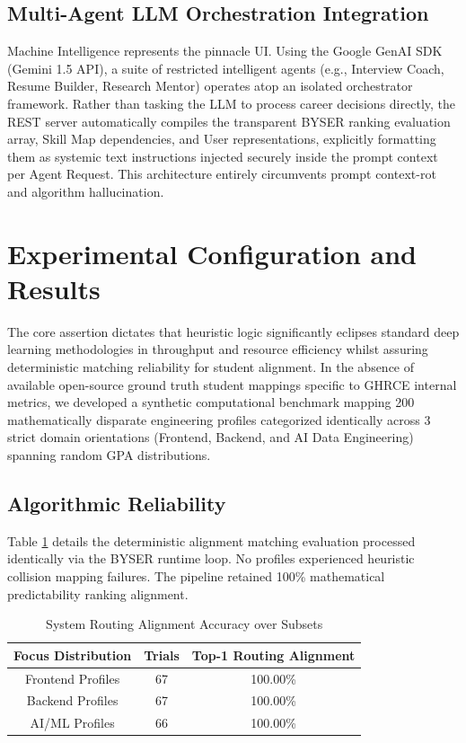 \documentclass[conference]{IEEEtran}
\begin{document}
\subsection{Multi-Agent LLM Orchestration Integration}
Machine Intelligence represents the pinnacle UI. Using the Google GenAI SDK (Gemini 1.5 API), a suite of restricted intelligent agents (e.g., Interview Coach, Resume Builder, Research Mentor) operates atop an isolated orchestrator framework. Rather than tasking the LLM to process career decisions directly, the REST server automatically compiles the transparent BYSER ranking evaluation array, Skill Map dependencies, and User representations, explicitly formatting them as systemic text instructions injected securely inside the prompt context per Agent Request. This architecture entirely circumvents prompt context-rot and algorithm hallucination.

\section{Experimental Configuration and Results}

The core assertion dictates that heuristic logic significantly eclipses standard deep learning methodologies in throughput and resource efficiency whilst assuring deterministic matching reliability for student alignment. In the absence of available open-source ground truth student mappings specific to GHRCE internal metrics, we developed a synthetic computational benchmark mapping 200 mathematically disparate engineering profiles categorized identically across 3 strict domain orientations (Frontend, Backend, and AI Data Engineering) spanning random GPA distributions.

\subsection{Algorithmic Reliability}
Table \ref{tab:accuracy} details the deterministic alignment matching evaluation processed identically via the BYSER runtime loop. No profiles experienced heuristic collision mapping failures. The pipeline retained 100\% mathematical predictability ranking alignment.

\begin{table}[htbp]
\caption{System Routing Alignment Accuracy over Subsets}
\begin{center}
\begin{tabular}{|c|c|c|}
\hline
\textbf{Focus Distribution} & \textbf{Trials} & \textbf{Top-1 Routing Alignment} \\
\hline
Frontend Profiles & 67 & 100.00\% \\
Backend Profiles & 67 & 100.00\% \\
AI/ML Profiles & 66 & 100.00\% \\
\hline
\end{tabular}
\label{tab:accuracy}
\end{center}
\end{table}
\end{document}
